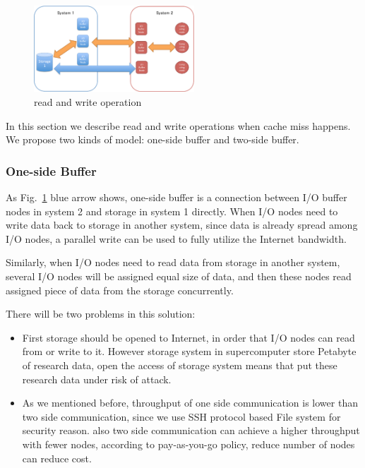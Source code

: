 \begin{figure}[tb]
	\centering
	\includegraphics[width=6cm]{../img/read_and_write}
	\caption{read and write operation}
	\label{read and write}
\end{figure}

In this section we describe read and write operations when cache miss happens.%
We propose two kinds of model: one-side buffer and two-side buffer.

\subsubsection{One-side Buffer}

As Fig.~\ref{read and write} blue arrow shows, one-side buffer is a connection between I/O buffer nodes in system 2 and storage in system 1 directly.
When I/O nodes need to write data back to storage in another system, since data is already spread among I/O nodes, a parallel write can be used to fully utilize the Internet bandwidth.

Similarly, when I/O nodes need to read data from storage in another system, several I/O nodes will be assigned equal size of data, and then these nodes read assigned piece of data from the storage concurrently.

There will be two problems in this solution:
\begin{itemize}
	\item First storage should be opened to Internet, in order that I/O nodes can read from or write to it.
		However storage system in supercomputer store Petabyte of research data, open the access of storage system means that put these research data under risk of attack.
	\item As we mentioned before, throughput of one side communication is lower than two side communication, since we use SSH protocol based File system for security reason.
		also two side communication can achieve a higher throughput with fewer nodes, according to pay-as-you-go policy, reduce number of nodes can reduce cost.
\end{itemize}

